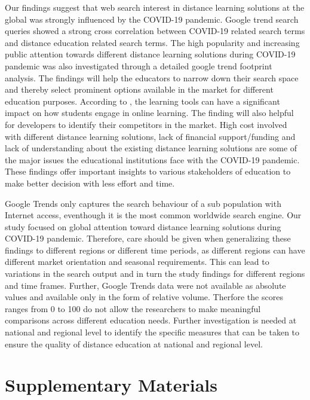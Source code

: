 \documentclass[11pt,a4paper,]{article}
\begin{document}
Our findings suggest that web search interest in distance learning solutions at the global was strongly influenced by the COVID-19 pandemic. Google trend search queries showed a strong cross correlation between COVID-19 related search terms and distance education related search terms. The high popularity and increasing public attention towards different distance learning solutions during COVID-19 pandemic was also investigated through a detailed google trend footprint analysis. The findings will help the educators to narrow down their search space and thereby select prominent options available in the market for different education purposes. According to \textcite{wallace2003online}, the learning tools can have a significant impact on how students engage in online learning. The finding will also helpful for developers to identify their competitors in the market. High cost involved with different distance learning solutions, lack of financial support/funding and lack of understanding about the existing distance learning solutions are some of the major issues the educational institutions face with the COVID-19 pandemic. These findings offer important insights to various stakeholders of education to make better decision with less effort and time.

Google Trends only captures the search behaviour of a sub population with Internet access, eventhough it is the most common worldwide search engine. Our study focused on global attention toward distance learning solutions during COVID-19 pandemic. Therefore, care should be given when generalizing these findings to different regions or different time periods, as different regions can have different market orientation and seasonal requirements. This can lead to variations in the search output and in turn the study findings for different regions and time frames. Further, Google Trends data were not available as absolute values and available only in the form of relative volume. Therfore the scores ranges from 0 to 100 do not allow the researchers to make meaningful comparisons across different education needs. Further investigation is needed at national and regional level to identify the specific measures that can be taken to ensure the quality of distance education at national and regional level.

\hypertarget{supplementary-materials}{%
\section*{Supplementary Materials}\label{supplementary-materials}}
\end{document}
